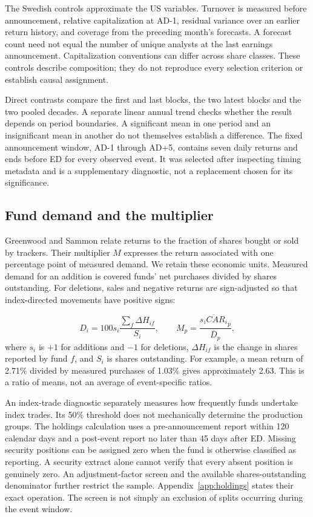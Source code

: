 The Swedish controls approximate the US variables. Turnover is measured before announcement, relative capitalization at AD-1, residual variance over an earlier return history, and coverage from the preceding month's forecasts. A forecast count need not equal the number of unique analysts at the last earnings announcement. Capitalization conventions can differ across share classes. These controls describe composition; they do not reproduce every selection criterion or establish causal assignment.

Direct contrasts compare the first and last blocks, the two latest blocks and the two pooled decades. A separate linear annual trend checks whether the result depends on period boundaries. A significant mean in one period and an insignificant mean in another do not themselves establish a difference. The fixed announcement window, AD-1 through AD+5, contains seven daily returns and ends before ED for every observed event. It was selected after inspecting timing metadata and is a supplementary diagnostic, not a replacement chosen for its significance.

\subsection{Fund demand and the multiplier}

Greenwood and Sammon relate returns to the fraction of shares bought or sold by trackers. Their multiplier $M$ expresses the return associated with one percentage point of measured demand. We retain these economic units. Measured demand for an addition is covered funds' net purchases divided by shares outstanding. For deletions, sales and negative returns are sign-adjusted so that index-directed movements have positive signs:
\begin{samepage}
\begin{equation}
 D_i=100s_i\frac{\sum_f\Delta H_{if}}{S_i},
 \qquad M_p=\frac{\overline{s_iCAR_i}_p}{\overline D_p},
 \label{eq:demand}
\end{equation}
where $s_i$ is $+1$ for additions and $-1$ for deletions, $\Delta H_{if}$ is the change in shares reported by fund $f$, and $S_i$ is shares outstanding. For example, a mean return of 2.71\% divided by measured purchases of 1.03\% gives approximately 2.63. This is a ratio of means, not an average of event-specific ratios.
\end{samepage}

An index-trade diagnostic separately measures how frequently funds undertake index trades. Its 50\% threshold does not mechanically determine the production groups. The holdings calculation uses a pre-announcement report within 120 calendar days and a post-event report no later than 45 days after ED. Missing security positions can be assigned zero when the fund is otherwise classified as reporting. A security extract alone cannot verify that every absent position is genuinely zero. An adjustment-factor screen and the available shares-outstanding denominator further restrict the sample. Appendix~\ref{app:holdings} states their exact operation. The screen is not simply an exclusion of splits occurring during the event window.

